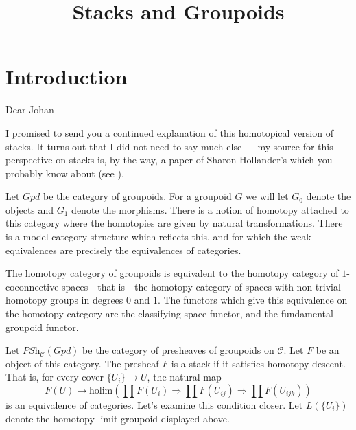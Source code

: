 

%


\title{Stacks and Groupoids}


\maketitle

\tableofcontents

\section{Introduction}
\label{section-introduction}

Dear Johan

\medskip\noindent
I promised to send you a continued explanation of this homotopical version
of stacks.  It turns out that I did not need to say much else --- my
source for this perspective on stacks is, by the way, a paper of 
Sharon Hollander's which you probably know about (see \cite{Hollander}).

\medskip\noindent
Let $\textit{Gpd}$ be the
category of groupoids.  For a groupoid $G$ we will let $G_0$ denote the
objects and $G_1$ denote the morphisms.  
There is a notion of homotopy attached to this
category where the homotopies are given by natural transformations.  There
is a model category structure which reflects this, and for which the weak
equivalences are precisely the equivalences of categories.

\medskip\noindent
The homotopy category of groupoids is equivalent to the homotopy category
of $1$-coconnective spaces - that is - the homotopy category of spaces
with non-trivial homotopy groups in degrees $0$ and $1$.  The functors
which give this equivalence on the homotopy category are the classifying
space functor, and the fundamental groupoid functor.


\medskip\noindent
Let $\textit{PSh}_\mathcal{C}(\textit{Gpd})$ be the category of presheaves of groupoids
on $\mathcal{C}$.  Let $F$ be an object of this category.  The presheaf $F$
is a stack if it satisfies homotopy descent.  That is, for every cover $\{
U_i \} \rightarrow U$, the natural map
$$
F(U)
\rightarrow
\text{holim}
\left(
\prod F(U_i) \Rightarrow \prod F(U_{ij}) \Rightarrow \prod F(U_{ijk})
\right)
$$
is an equivalence of categories.  Let's examine this condition closer.  Let
$L(\{U_i\})$ denote the homotopy limit groupoid displayed above.


